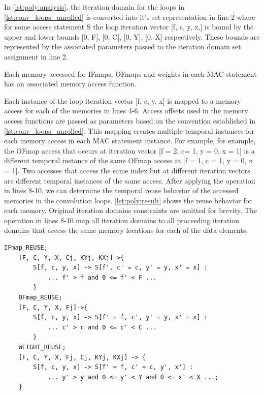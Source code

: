 In \autoref{lst:poly:analysis}, the iteration domain for the loops in
\autoref{lst:conv_loops_unrolled} is converted into it's set representation in
line 2 where for some access statement S the loop iteration vector [f, c, y, x,]
is bound by the upper and lower bounds [0, F], [0, C], [0, Y], [0, X]
respectively. These bounds are represented by the associated parameters passed
to the iteration domain set assignment in line 2. 

Each memory accessed for IFmaps, OFmaps and weights in each MAC statement has
an associated memory access function. 

Each instance of the loop iteration vector [f, c, y, x]
is mapped to a memory access for each of the memories in lines 4-6. Access
offsets used in the memory access functions are passed as parameters based on
the convention established in \autoref{lst:conv_loops_unrolled}. This mapping
creates multiple temporal instances for each memory access in each \ac{MAC}
statement instance.  For
example, for example, the OFmap access that occurs at iteration vector [f = 2, c= 1, y = 0,
x = 1] is a different temporal instance of the same OFmap access at [f = 1, c = 1,
y = 0, x = 1]. 
Two accesses that access the same index but at different
iteration vectors are different temporal instances of the same access.
After applying the operation in lines 8-10, we can determine the
temporal reuse behavior of the accessed memories in the convolution loops.  
\autoref{lst:poly:result} shows the reuse behavior for each memory. Original
iteration domains constraints are omitted for brevity. The operation in lines
8-10 map all iteration domains to all proceeding iteration domains that access
the same memory locations for each of the data elements.

\clearpage
\begin{lstlisting}[caption=Polyhedral analysis results w.r.t data elements in convolution loops, label={lst:poly:result}]
    IFmap_REUSE;
    [F, C, Y, X, Cj, KYj, KXj]->{
        S[f, c, y, x] -> S[f', c' = c, y' = y, x' = x] :
            ... f' > f and 0 <= f' < F ... 
        }
    OFmap_REUSE;
    [F, C, Y, X, Fj]->{ 
        S[f, c, y, x] -> S[f' = f, c', y' = y, x' = x] : 
            ... c' > c and 0 <= c' < C ... 
        }
    WEIGHT_REUSE;
    [F, C, Y, X, Fj, Cj, KYj, KXj] -> { 
        S[f, c, y, x] -> S[f' = f, c' = c, y', x'] : 
            ... y' > y and 0 <= y' < Y and 0 <= x' < X ...; 
    }
\end{lstlisting}

